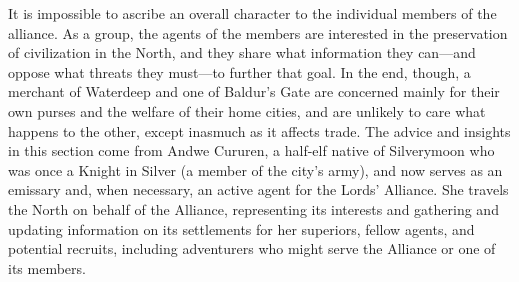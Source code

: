 \documentclass[10pt,a4paper,twoside,twocolumn,openany,bg=print,nodeprecatedcode]{dndbook}
\begin{document}
It is impossible to ascribe an overall character to the individual members of the alliance. As a group, the agents of the members are interested in the preservation of civilization in the North, and they share what information they can—and oppose what threats they must—to further that goal. In the end, though, a merchant of Waterdeep and one of Baldur's Gate are concerned mainly for their own purses and the welfare of their home cities, and are unlikely to care what happens to the other, except inasmuch as it affects trade.
The advice and insights in this section come from Andwe Cururen, a half-elf native of Silverymoon who was once a Knight in Silver (a member of the city's army), and now serves as an emissary and, when necessary, an active agent for the Lords' Alliance. She travels the North on behalf of the Alliance, representing its interests and gathering and updating information on its settlements for her superiors, fellow agents, and potential recruits, including adventurers who might serve the Alliance or one of its members.
\end{document}

